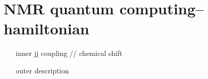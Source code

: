 \documentclass[]{report}
\title{}
\author{}
\begin{document}
\maketitle

\begin{abstract}
\end{abstract}

\chapter{NMR quantum computing--hamiltonian}

\begin{enumerate}
	\item[inner] jj coupling   //   chemical shift
	\item[outer] description
\end{enumerate}
\end{document}
